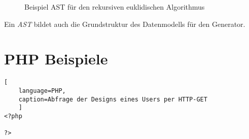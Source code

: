 \begin{figure}[htb]
    \centering
        \centering
    \caption{Beispiel AST für den rekursiven euklidischen Algorithmus}
    \label{fig:ast}   
\end{figure}

Ein \emph{AST} bildet auch die Grundstruktur des Datenmodells für den Generator. 

\section{PHP Beispiele}

\begin{lstlisting}[
    language=PHP,
    caption=Abfrage der Designs eines Users per HTTP-GET
    ]
<?php

?>
\end{lstlisting}
